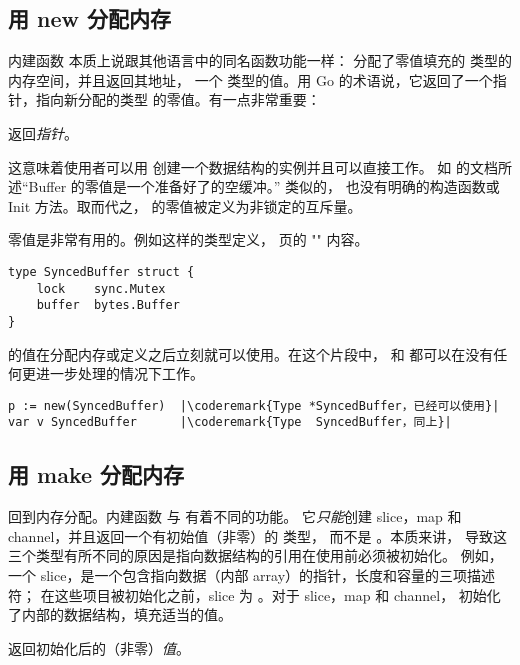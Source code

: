 \subsection{用 new 分配内存}
\label{sec:allocation with new}
内建函数  本质上说跟其他语言中的同名函数功能一样：
 分配了零值填充的  类型的内存空间，并且返回其地址，
一个  类型的值。用 Go 的术语说，它返回了一个指针，指向新分配的类型 
的零值。有一点非常重要：
\begin{lbar}[]
 返回\emph{指针}。
\end{lbar}

这意味着使用者可以用  创建一个数据结构的实例并且可以直接工作。
如  的文档所述“Buffer 的零值是一个准备好了的空缓冲。”
类似的， 也没有明确的构造函数或 Init 方法。取而代之，
 的零值被定义为非锁定的互斥量。

零值是非常有用的。例如这样的类型定义，\pageref{sec:defining your own}
页的 "" 内容。
\begin{lstlisting}
type SyncedBuffer struct {
    lock    sync.Mutex
    buffer  bytes.Buffer
}
\end{lstlisting}
 的值在分配内存或定义之后立刻就可以使用。在这个片段中，
 和  都可以在没有任何更进一步处理的情况下工作。
\begin{lstlisting}
p := new(SyncedBuffer)  |\coderemark{Type *SyncedBuffer，已经可以使用}|
var v SyncedBuffer      |\coderemark{Type  SyncedBuffer，同上}|
\end{lstlisting}

\subsection{用 make 分配内存}
\label{sec:allocation with make}
回到内存分配。内建函数  与  有着不同的功能。
它\emph{只能}创建 slice，map 和 channel，并且返回一个有初始值（非零）的  类型，
而不是 。本质来讲，
导致这三个类型有所不同的原因是指向数据结构的引用在使用前必须被初始化。
例如，一个 slice，是一个包含指向数据（内部 array）的指针，长度和容量的三项描述符；
在这些项目被初始化之前，slice 为 。对于 slice，map 和 channel，
 初始化了内部的数据结构，填充适当的值。

\begin{lbar}[]
 返回初始化后的（非零）\emph{值}。
\end{lbar}

